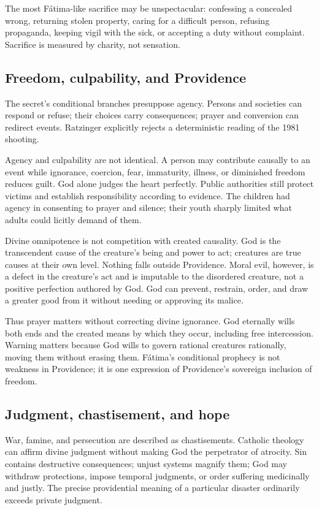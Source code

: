 The most Fátima-like sacrifice may be unspectacular: confessing a concealed wrong, returning stolen property, caring for a difficult person, refusing propaganda, keeping vigil with the sick, or accepting a duty without complaint. Sacrifice is measured by charity, not sensation.

\subsection{Freedom, culpability, and Providence}

The secret's conditional branches presuppose agency. Persons and societies can respond or refuse; their choices carry consequences; prayer and conversion can redirect events. Ratzinger explicitly rejects a deterministic reading of the 1981 shooting.

Agency and culpability are not identical. A person may contribute causally to an event while ignorance, coercion, fear, immaturity, illness, or diminished freedom reduces guilt. God alone judges the heart perfectly. Public authorities still protect victims and establish responsibility according to evidence. The children had agency in consenting to prayer and silence; their youth sharply limited what adults could licitly demand of them.

Divine omnipotence is not competition with created causality. God is the transcendent cause of the creature's being and power to act; creatures are true causes at their own level. Nothing falls outside Providence. Moral evil, however, is a defect in the creature's act and is imputable to the disordered creature, not a positive perfection authored by God. God can prevent, restrain, order, and draw a greater good from it without needing or approving its malice.

Thus prayer matters without correcting divine ignorance. God eternally wills both ends and the created means by which they occur, including free intercession. Warning matters because God wills to govern rational creatures rationally, moving them without erasing them. Fátima's conditional prophecy is not weakness in Providence; it is one expression of Providence's sovereign inclusion of freedom.

\subsection{Judgment, chastisement, and hope}

War, famine, and persecution are described as chastisements. Catholic theology can affirm divine judgment without making God the perpetrator of atrocity. Sin contains destructive consequences; unjust systems magnify them; God may withdraw protections, impose temporal judgments, or order suffering medicinally and justly. The precise providential meaning of a particular disaster ordinarily exceeds private judgment.

